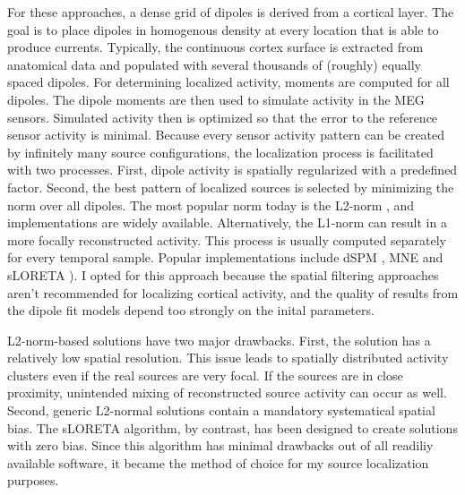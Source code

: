 For these approaches, a dense grid of dipoles is derived from a cortical layer.
The goal is to place dipoles in homogenous density at every location that is able to produce currents.
Typically, the continuous cortex surface is extracted from anatomical data and populated with several thousands of (roughly) equally spaced dipoles.
For determining localized activity, moments are computed for all dipoles.
The dipole moments are then used to simulate activity in the MEG sensors.
Simulated activity then is optimized so that the error to the reference sensor activity is minimal.
Because every sensor activity pattern can be created by infinitely many source configurations, the localization process is facilitated with two processes.
First, dipole activity is spatially regularized with a predefined factor.
Second, the best pattern of localized sources is selected by minimizing the norm over all dipoles.
The most popular norm today is the L2-norm \cite{1.5.L2}, and implementations are widely available.
Alternatively, the L1-norm \cite{1.5.L1} can result in a more focally reconstructed activity.
This process is usually computed separately for every temporal sample.
Popular implementations include dSPM \cite{1.5.dSPM}, MNE \cite{1.5.MNE} and sLORETA \cite{1.5.sLORETA}).
I opted for this approach because the spatial filtering approaches aren't recommended for localizing cortical activity, and the quality of results from the dipole fit models depend too strongly on the inital parameters.

L2-norm-based solutions have two major drawbacks.
First, the solution has a relatively low spatial resolution.
This issue leads to spatially distributed activity clusters even if the real sources are very focal.
If the sources are in close proximity, unintended mixing of reconstructed source activity can occur as well.
Second, generic L2-normal solutions contain a mandatory systematical spatial bias.
The sLORETA algorithm, by contrast, has been designed to create solutions with zero bias.
Since this algorithm has minimal drawbacks out of all readiliy available software, it became the method of choice for my source localization purposes.

